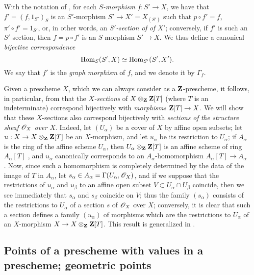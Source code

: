 \begin{env}[3.3.14]
\label{1.3.3.14}
With the notation of , for each \emph{$S$-morphism}
$f:S'\to X$, we have that $f'=(f,1_{S'})_S$ is an $S'$-morphism $S'\to X'=X_{(S')}$ such that
$p\circ f'=f$, $\pi'\circ f'=1_{S'}$, or, in other words, an \emph{$S'$-section of
of $X'$}; conversely, if $f'$ is such an $S'$-section, then $f=p\circ f'$ is an
$S$-morphism $S'\to X$. We thus define a canonical
\emph{bijective correspondence}
\[
  \operatorname{Hom}_S(S',X)\simeq\operatorname{Hom}_{S'}(S',X').
\]
We say that $f'$ is the \emph{graph morphism} of $f$, and we denote it by
$\Gamma_f$.
\end{env}

\begin{env}[3.3.15]
\label{1.3.3.15}
Given a prescheme $X$, which we can always consider as a $\mathbf{Z}$-prescheme,
it follows, in particular, from  that the \emph{$X$-sections} of
$X\otimes_\mathbf{Z}\mathbf{Z}[T]$ (where $T$ is an indeterminate)
correspond bijectively with \emph{morphisms} $\bb{Z}[T]\to X$. We will show that these
$X$-sections also correspond bijectively with \emph{sections of the structure
sheaf $\mathscr{O}_X$ over $X$}. Indeed, let $(U_\alpha)$ be a cover of $X$ by
affine open subsets; let $u:X\to X\otimes_\bb{Z}\bb{Z}[T]$ be an $X$-morphism, and let
$u_\alpha$ be its restriction to $U_\alpha$; if $A_\alpha$ is the ring of the
affine scheme $U_\alpha$, then $U_\alpha\otimes_\mathbf{Z}\mathbf{Z}[T]$ is an affine
scheme of ring $A_\alpha[T]$ , and $u_\alpha$ canonically
corresponds to an $A_\alpha$-homomorphism $A_\alpha[T]\to A_\alpha$
. Now, since such a homomorphism is completely determined by the
data of the image of $T$ in $A_\alpha$, let
$s_\alpha\in A_\alpha=\Gamma(U_\alpha,\mathscr{O}_X)$, and if we suppose that the
restrictions of $u_\alpha$ and $u_\beta$ to an affine open subset
$V\subset U_\alpha\cap U_\beta$ coincide, then we see immediately that
$s_\alpha$ and $s_\beta$ coincide on $V$; thus the family $(s_\alpha)$ consists
of the restrictions to $U_\alpha$ of a section $s$ of $\mathscr{O}_X$ over $X$;
conversely, it is clear that such a section defines a family $(u_\alpha)$ of
morphisms which are the restrictions to $U_\alpha$ of an $X$-morphism
$X\to X\otimes_\bb{Z}\bb{Z}[T]$. This result is generalized in
.
\end{env}

\subsection{Points of a prescheme with values in a prescheme; geometric points}
\label{subsection:1.3.4}


